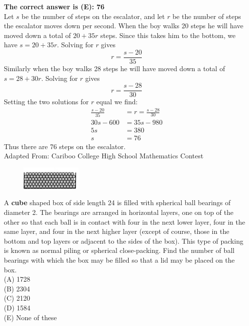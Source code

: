 \documentclass{article}
\begin{document}
\textbf{The correct answer is (E): 76}\\[1 ex]
Let $s$ be the number of steps on the escalator, and let $r$ be the number of steps the escalator moves down per second. When the boy walks 20 steps he will have moved down a total of $20+35r$ steps. Since this takes him to the bottom, we have $s=20+35r$.  Solving for $r$ gives
\begin{equation*}
r=\frac{s-20}{35}
\end{equation*}
Similarly when the boy walks 28 steps he will have moved down a total of $s=28+30r$. Solving for $r$ gives
\begin{equation*}
r=\frac{s-28}{30}
\end{equation*}
Setting the two solutions for $r$ equal we find:
\begin{align*}
\frac{s-20}{35}&=r=\frac{s-28}{30}\\
30s-600&=35s-980\\
5s&=380\\
s&=76
\end{align*}
Thus there are 76 steps on the escalator.
\\[5 ex]

\scriptsize
Adapted From: Cariboo College High School Mathematics Contest

\normalsize
\begin{figure}
	\includegraphics[width=30mm,viewport=27 69 511 230]{CCFR73-10pic1.eps}
\end{figure}
A \textbf{cube} shaped box of side length 24 is filled with spherical ball bearings of diameter 2. The bearings are arranged in horizontal layers, one on top of the other so that each ball is in contact with four in the next lower layer, four in the same layer, and four in the next higher layer (except of course, those in the bottom and top layers or adjacent to the sides of the box). This type of packing is known as normal piling or spherical close-packing. Find the number of ball bearings with which the box may be filled so that a lid may be placed on the box.\\
(A) 1728\\
(B) 2304\\
(C) 2120\\
(D) 1584\\
(E) None of these\\
\end{document}
